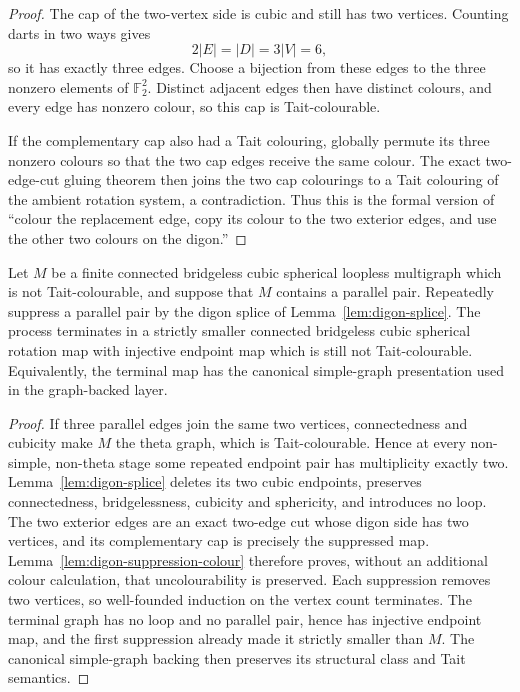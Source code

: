\begin{proof}
The cap of the two-vertex side is cubic and still has two vertices.  Counting
darts in two ways gives
\[
  2|E|=|D|=3|V|=6,
\]
so it has exactly three edges.  Choose a bijection from these edges to the
three nonzero elements of $\mathbb F_2^2$.  Distinct adjacent edges then have
distinct colours, and every edge has nonzero colour, so this cap is
Tait-colourable.

If the complementary cap also had a Tait colouring, globally permute its
three nonzero colours so that the two cap edges receive the same colour.
The exact two-edge-cut gluing theorem then joins the two cap colourings to a
Tait colouring of the ambient rotation system, a contradiction.  Thus this
is the formal version of ``colour the replacement edge, copy its colour to
the two exterior edges, and use the other two colours on the digon.''
\end{proof}

\begin{corollary}
\label{cor:parallel-seam-normalization}
Let \(M\) be a finite connected bridgeless cubic spherical loopless
multigraph which is not Tait-colourable, and suppose that \(M\) contains a
parallel pair.  Repeatedly suppress a parallel pair by the digon splice of
Lemma~\ref{lem:digon-splice}.  The process terminates in a strictly smaller
connected bridgeless cubic spherical rotation map with injective endpoint
map which is still not Tait-colourable.  Equivalently, the terminal map has
the canonical simple-graph presentation used in the graph-backed layer.
\end{corollary}

\begin{proof}
If three parallel edges join the same two vertices, connectedness and
cubicity make \(M\) the theta graph, which is Tait-colourable.  Hence at every
non-simple, non-theta stage some repeated endpoint pair has multiplicity
exactly two.
Lemma~\ref{lem:digon-splice} deletes its two cubic endpoints, preserves
connectedness, bridgelessness, cubicity and sphericity, and introduces no
loop.  The two exterior edges are an exact two-edge cut whose digon side has
two vertices, and its complementary cap is precisely the suppressed map.
Lemma~\ref{lem:digon-suppression-colour} therefore proves, without an
additional colour calculation, that uncolourability is preserved.  Each
suppression removes two vertices, so
well-founded induction on the vertex count terminates.  The terminal graph
has no loop and no parallel pair, hence has injective endpoint map, and the
first suppression already made it strictly smaller than \(M\).  The canonical
simple-graph backing then preserves its structural class and Tait semantics.
\end{proof}


